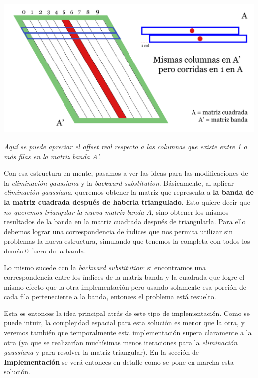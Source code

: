 	\begin{center}
		\includegraphics[scale=1]{./img/matriz_A_offset.png}
		\vspace{2pt}
		\par
		\footnotesize\textit{Aquí se puede apreciar el offset real respecto a las columnas que existe entre 1 o más filas en la matriz banda A'.}
	\end{center}
	
\vspace{\baselineskip}

\vspace{\baselineskip}
\par

Con esa estructura en mente, pasamos a ver las ideas para las modificaciones de la \textit{eliminación gaussiana} y la \textit{backward substitution}. Básicamente, al aplicar \textit{eliminación gaussiana}, queremos obtener la matriz que representa a \textbf{la banda de la matriz cuadrada después de haberla triangulado}. Esto quiere decir que \textit{no queremos triangular la nueva matriz banda $A$}, sino obtener los mismos resultados de la banda en la matriz cuadrada después de triangularla. Para ello debemos lograr una correspondencia de índices que nos permita utilizar sin problemas la nueva estructura, simulando que tenemos la completa con todos los demás 0 fuera de la banda.

Lo mismo sucede con la \textit{backward substitution}: si encontramos una correspondencia entre los índices de la matriz banda y la cuadrada que logre el mismo efecto que la otra implementación pero usando solamente esa porción de cada fila perteneciente a la banda, entonces el problema está resuelto.

\vspace{\baselineskip}
Esta es entonces la idea principal atrás de este tipo de implementación. Como se puede intuir, la complejidad espacial para esta solución es menor que la otra, y veremos también que temporalmente esta implementación supera claramente a la otra (ya que se realizarían muchísimas menos iteraciones para la \textit{eliminación gaussiana} y para resolver la matriz triangular). En la sección de \textbf{Implementación} se verá entonces en detalle como se pone en marcha esta solución.


